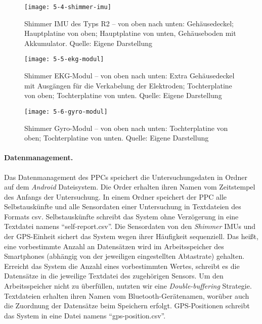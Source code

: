 


\begin{figure}[t]
	\centering
		\texttt{[image: 5-4-shimmer-imu]}
	\caption[Shimmer IMU des Typs R2]{Shimmer IMU des Typs R2 -- von oben nach unten: Gehäusedeckel; Hauptplatine von oben; Hauptplatine von unten, Gehäuseboden mit Akkumulator. Quelle: Eigene Darstellung}
	\label{fig:5_4_shimmer_imu}
\end{figure}

\begin{figure}[t]
	\centering
		\texttt{[image: 5-5-ekg-modul]}
	\caption[Shimmer EKG-Modul]{Shimmer EKG-Modul -- von oben nach unten: Extra Gehäusedeckel mit Ausgängen für die Verkabelung der Elektroden; Tochterplatine von oben; Tochterplatine von unten. Quelle: Eigene Darstellung}
	\label{fig:5_5_ekg_modul}
\end{figure}

\begin{figure}[t]
	\centering
		\texttt{[image: 5-6-gyro-modul]}
	\caption[Shimmer Gyro-Modul]{Shimmer Gyro-Modul -- von oben nach unten: Tochterplatine von oben; Tochterplatine von unten. Quelle: Eigene Darstellung}
	\label{fig:5_6_gyro_modul}
\end{figure}

\paragraph{Datenmanagement.}
Das Datenmanagement des \ac{PPC}s speichert die Untersuchungsdaten in Ordner auf dem \emph{Android} Dateisystem. Die Order erhalten ihren Namen vom Zeitstempel des Anfangs der Untersuchung. In einem Ordner speichert der \ac{PPC} alle Selbstauskünfte und alle Sensordaten einer Untersuchung in Textdateien des Formats \acs{csv}. Selbstauskünfte schreibt das System ohne Verzögerung in eine Textdatei namens "`self-report.csv"'. Die Sensordaten von den \emph{Shimmer} \acp{IMU} und der \ac{GPS}-Einheit sichert das System wegen ihrer Häufigkeit sequenziell. Das heißt, eine vorbestimmte Anzahl an Datensätzen wird im Arbeitsspeicher des Smartphones (abhängig von der jeweiligen eingestellten Abtastrate) gehalten. Erreicht das System die Anzahl eines vorbestimmten Wertes, schreibt es die Datensätze in die jeweilige Textdatei des zugehörigen Sensors. Um den Arbeitsspeicher nicht zu überfüllen, nutzten wir eine \emph{Double-buffering} Strategie. Textdateien erhalten ihren Namen vom Bluetooth-Gerätenamen, worüber auch die Zuordnung der Datensätze beim Speichern erfolgt. \ac{GPS}-Positionen schreibt das System in eine Datei namens "`gps-position.csv"'.

